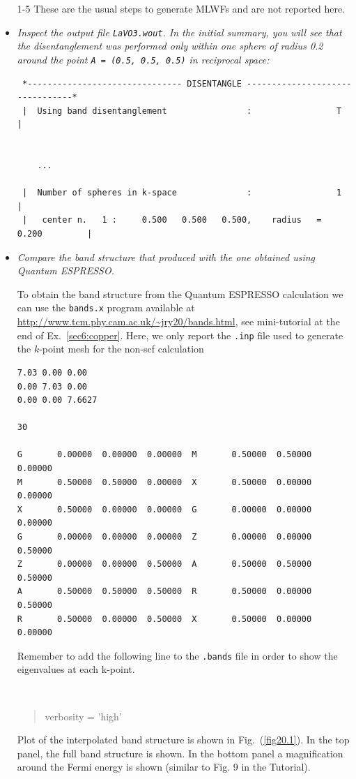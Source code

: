 \begin{itemize}
	\item [1-5] These are the usual steps to generate MLWFs and are not reported here.

	\item {\it Inspect the output file {\tt LaVO3.wout}. In the initial summary, you will see that the disentanglement was
performed only within one sphere of radius 0.2 around the point {\tt A = (0.5, 0.5, 0.5)} in reciprocal space:}

{\small 
\begin{tcolorbox}[sharp corners,boxrule=0.5pt]
\begin{verbatim}
 *------------------------------- DISENTANGLE --------------------------------*
 |  Using band disentanglement                :                 T             |


 	...

 |  Number of spheres in k-space              :                 1             |
 |   center n.   1 :     0.500   0.500   0.500,    radius   =   0.200         |
\end{verbatim}
\end{tcolorbox}
}

\item {\it Compare the band structure that \Wannier{} produced with the one obtained using Quantum ESPRESSO.}

To obtain the band structure from the Quantum ESPRESSO calculation we can use the {\tt bands.x} program available at \url{http://www.tcm.phy.cam.ac.uk/~jry20/bands.html}, see mini-tutorial at the end of Ex.~\ref{sec6:copper}. Here, we only report the {\tt .inp} file used to generate the $k$-point mesh for the non-scf calculation
{\small 
\begin{tcolorbox}[title=bands.x input file LaVO3.inp,sharp corners,boxrule=0.5pt]
\begin{verbatim}
7.03 0.00 0.00
0.00 7.03 0.00
0.00 0.00 7.6627

30

G       0.00000  0.00000  0.00000  M       0.50000  0.50000  0.00000
M       0.50000  0.50000  0.00000  X       0.50000  0.00000  0.00000
X       0.50000  0.00000  0.00000  G       0.00000  0.00000  0.00000
G       0.00000  0.00000  0.00000  Z       0.00000  0.00000  0.50000
Z       0.00000  0.00000  0.50000  A       0.50000  0.50000  0.50000
A       0.50000  0.50000  0.50000  R       0.50000  0.00000  0.50000
R       0.50000  0.00000  0.50000  X       0.50000  0.00000  0.00000
\end{verbatim}
\end{tcolorbox}
}
Remember to add the following line to the {\tt .bands} file in order to show the eigenvalues at each k-point. 
{\tt
\begin{quote}
verbosity      = 'high'
\end{quote}
}
Plot of the interpolated band structure is shown in Fig.~(\ref{fig20.1}). In the top panel, the full band structure is shown. In the bottom panel a magnification around the Fermi energy is shown (similar to Fig. 9 in the Tutorial).
\end{itemize}


